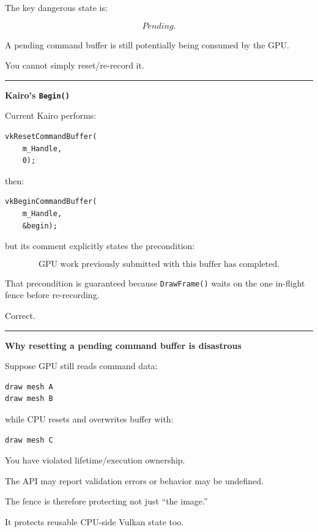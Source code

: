 The key dangerous state is:

\[
\boxed{Pending}.
\]

A pending command buffer is still potentially being consumed by the GPU.

You cannot simply reset/re-record it.

\begin{center}\rule{0.5\linewidth}{0.5pt}\end{center}

\textbf{Kairo's \texttt{Begin()}}

Current Kairo performs:

\begin{verbatim}
vkResetCommandBuffer(
    m_Handle,
    0);
\end{verbatim}

then:

\begin{verbatim}
vkBeginCommandBuffer(
    m_Handle,
    &begin);
\end{verbatim}

but its comment explicitly states the precondition:

\[
\boxed{
\text{GPU work previously submitted with this buffer has completed}.
}
\]

That precondition is guaranteed because \texttt{DrawFrame()} waits on the one in-flight fence before re-recording.

Correct.

\begin{center}\rule{0.5\linewidth}{0.5pt}\end{center}

\textbf{Why resetting a pending command buffer is disastrous}

Suppose GPU still reads command data:

\begin{verbatim}
draw mesh A
draw mesh B
\end{verbatim}

while CPU resets and overwrites buffer with:

\begin{verbatim}
draw mesh C
\end{verbatim}

You have violated lifetime/execution ownership.

The API may report validation errors or behavior may be undefined.

The fence is therefore protecting not just ``the image.''

It protects reusable CPU-side Vulkan state too.

